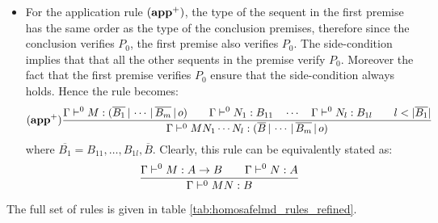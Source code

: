 \begin{itemize}
\item For the application rule $\mathbf{(app^+)}$, the type of the sequent in the first premise has the same order
as the type of the conclusion premises, therefore since the conclusion verifies $P_0$, the first premise also verifies $P_0$.
The side-condition implies that that all the other sequents in the premise verify $P_0$. Moreover the fact
that the first premise verifies $P_0$ ensure that the side-condition always holds. Hence the rule becomes:
$$ \mathbf{(app^+)}
    \frac{\displaystyle 
        \Gamma \vdash^0 M : (\overline{B_1} \, | \, \cdots \, | \, \overline{B_m} \, | \, o) \qquad
        \Gamma \vdash^0 N_1 : B_{11} \quad \cdots \quad \Gamma \vdash^0 N_{l} : B_{1l} \qquad l < |\overline{B_1}|
    }{
        \Gamma \vdash^0 M N_1 \cdots N_{l} : (\overline{B} \, | \, \cdots \, | \, \overline{B_m} \, | \, o)
    }
$$
where $\overline{B_1} = B_{11}, \ldots, B_{1l},\overline{B}$.
Clearly, this rule can be equivalently stated as:
$$ \frac{\displaystyle \Gamma \vdash^0 M : A\rightarrow B
                                        \qquad \Gamma \vdash^{0} N : A
                                   }{\Gamma  \vdash^{0} M N : B}$$
\end{itemize}

The full set of rules is given in table \ref{tab:homosafelmd_rules_refined}.

